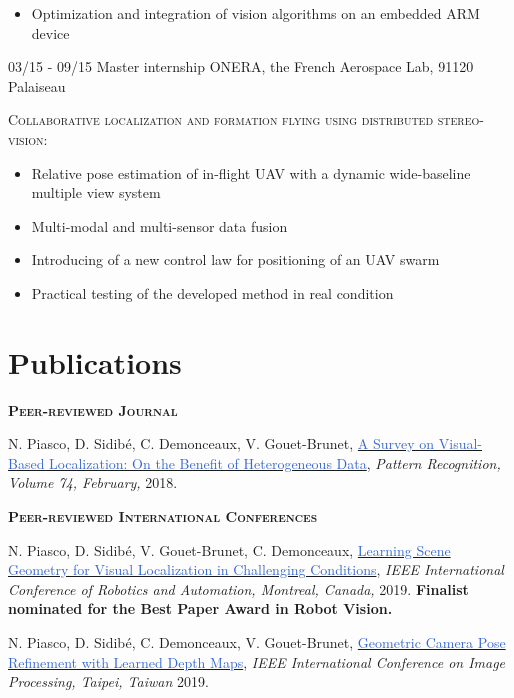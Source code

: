 \documentclass[]{friggeri-cv-cust}
\begin{document}
\begin{entrylist}
{\begin{itemize}[label=$\rhd$]
        \item Optimization and integration of vision algorithms on an embedded ARM device
    \end{itemize}\vspace{5pt}}
  \entry
    {03/15 - 09/15}
    {Master internship}
    {ONERA, the French Aerospace Lab, 91120 Palaiseau}
    {\textsc{Collaborative localization and formation ﬂying using distributed stereo-vision:}
    \begin{itemize}[label=$\rhd$]
    	\item Relative pose estimation of in-flight UAV with a dynamic wide-baseline multiple view system
    	\item Multi-modal and multi-sensor data fusion
        \item Introducing of a new control law for positioning of an UAV swarm 
        \item Practical testing of the developed method in real condition
    \end{itemize} \vspace{5pt}}
\end{entrylist}

\newpage
\section{Publications}
    \textsc{\textbf{Peer-reviewed Journal}}
    
    {\footnotesize{N. Piasco, D. Sidibé, C. Demonceaux, V. Gouet-Brunet, \href{http://recherche.ign.fr/labos/matis/pdf/articles_revues/2017/PSDG17.pdf}{\textcolor{highlight}{A Survey on Visual-Based Localization: On the Benefit of Heterogeneous Data}},
\textit{Pattern Recognition, Volume 74, February,} 2018.}}
	
	\vspace{0.5cm}
    \textsc{\textbf{Peer-reviewed International Conferences}}
    
    {\footnotesize{N. Piasco, D. Sidibé, V. Gouet-Brunet, C. Demonceaux, \href{http://recherche.ign.fr/labos/matis/pdf/articles_conf/2019/root.pdf}{\textcolor{highlight}{Learning Scene Geometry for Visual Localization in Challenging Conditions}},
\textit{IEEE International Conference of Robotics and Automation, Montreal, Canada,} 2019. \textbf{Finalist nominated for the Best Paper Award in Robot Vision.}}}

    {\footnotesize{N. Piasco, D. Sidibé,  C. Demonceaux, V. Gouet-Brunet, \href{}{\textcolor{highlight}{Geometric Camera Pose Refinement with Learned Depth Maps}},
\textit{IEEE International Conference on Image Processing, Taipei, Taiwan} 2019.}}
\end{document}
